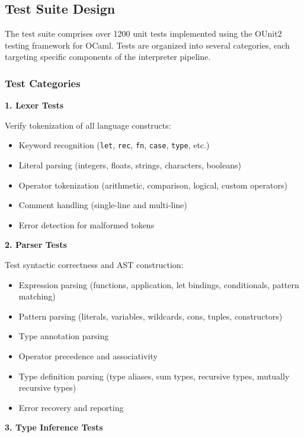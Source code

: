 \documentclass[conference,onecolumn]{IEEEtran}
\begin{document}
\subsection{Test Suite Design}

The test suite comprises over 1200 unit tests implemented using the OUnit2 testing framework for OCaml. Tests are organized into several categories, each targeting specific components of the interpreter pipeline.

\subsubsection{Test Categories}

\textbf{1. Lexer Tests}

Verify tokenization of all language constructs:
\begin{itemize}
\item Keyword recognition (\texttt{let}, \texttt{rec}, \texttt{fn}, \texttt{case}, \texttt{type}, etc.)
\item Literal parsing (integers, floats, strings, characters, booleans)
\item Operator tokenization (arithmetic, comparison, logical, custom operators)
\item Comment handling (single-line and multi-line)
\item Error detection for malformed tokens
\end{itemize}

\textbf{2. Parser Tests}

Test syntactic correctness and AST construction:
\begin{itemize}
\item Expression parsing (functions, application, let bindings, conditionals, pattern matching)
\item Pattern parsing (literals, variables, wildcards, cons, tuples, constructors)
\item Type annotation parsing
\item Operator precedence and associativity
\item Type definition parsing (type aliases, sum types, recursive types, mutually recursive types)
\item Error recovery and reporting
\end{itemize}

\textbf{3. Type Inference Tests}
\end{document}
